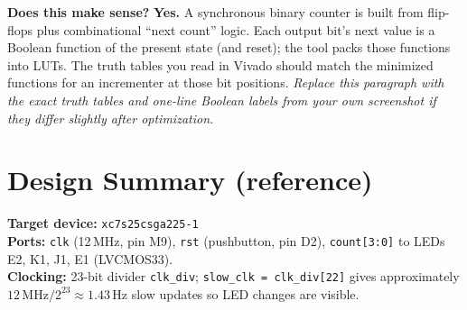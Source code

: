 \documentclass[12pt, letterpaper]{article}
\begin{document}
\textbf{Does this make sense?}  \textbf{Yes.}  A synchronous binary counter is built from
flip-flops plus combinational ``next count'' logic.  Each output bit's next value is a Boolean
function of the present state (and reset); the tool packs those functions into LUTs.  The
truth tables you read in Vivado should match the minimized functions for an incrementer at
those bit positions.  \emph{Replace this paragraph with the exact truth tables and one-line
Boolean labels from your own screenshot if they differ slightly after optimization.}

\section{Design Summary (reference)}

\noindent\textbf{Target device:} \texttt{xc7s25csga225-1}\\
\textbf{Ports:} \texttt{clk} (12\,MHz, pin M9), \texttt{rst} (pushbutton, pin D2),
\texttt{count[3:0]} to LEDs E2, K1, J1, E1 (LVCMOS33).\\
\textbf{Clocking:} 23-bit divider \texttt{clk\_div}; \texttt{slow\_clk = clk\_div[22]} gives
approximately $12\,\text{MHz}/2^{23} \approx 1.43$\,Hz slow updates so LED changes are visible.
\end{document}
